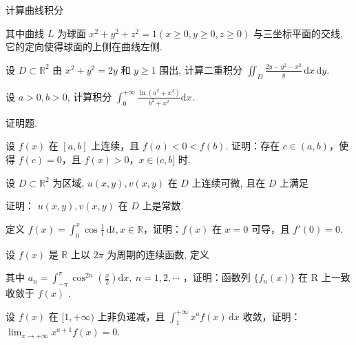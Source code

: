 计算曲线积分\par
\nopagebreak[4]
其中曲线 $L$ 为球面 $x^{2} + y^{2} + z^{2} = 1 (x \geq 0, y \geq 0, z \geq 0)$ 与三坐标平面的交线, 它的定向使得球面的上侧在曲线左侧.\par
设 $D \subset \mathbb{R}^2$ 由 $x^2 + y^2 = 2y$ 和 $y \geq 1$ 围出, 计算二重积分 $\iint_{D} \frac{2y - y^2 - x^2}{y} \, \mathrm{d}x \, \mathrm{d}y$.\par
设 $a > 0, b > 0$, 计算积分 $\int_0^{+\infty} \frac{\ln(a^2 + x^2)}{b^2 + x^2} \mathrm{d}x$.\par
\par{}
证明题.\par
设 $f(x)$ 在 $[a, b]$ 上连续，且 $f(a) < 0 < f(b)$. 证明：存在 $c \in (a, b)$，使得 $f(c) = 0$，且 $f(x) > 0$，$x \in (c, b]$ 时.\par
\par{}
设 $D \subset \mathbb{R}^2$ 为区域, $u(x, y), v(x, y)$ 在 $D$ 上连续可微, 且在 $D$ 上满足\par
\nopagebreak[4]
证明： $u(x,y),v(x,y)$ 在 $D$ 上是常数.\par
定义 $f(x) = \int_0^x \cos \frac{1}{t} \, \mathrm{d}t, x \in \mathbb{R}$，证明：$f(x)$ 在 $x = 0$ 可导，且 $f'(0) = 0$.\par
\par{}
设 $f(x)$ 是 $\mathbb{R}$ 上以 $2\pi$ 为周期的连续函数, 定义\par
\nopagebreak[4]
其中  $a_{n}=\int_{-\pi}^{\pi}\cos^{2n}\left(\frac{x}{2}\right)\mathrm{d}x,\ n=1,2,\cdots$  ，证明：函数列  $\{f_{n}(x)\}$  在 R 上一致收敛于  $f(x)$ .\par
设 $f(x)$ 在 $[1, +\infty)$ 上非负递减，且 $\int_{1}^{+\infty} x^{a} f(x) \, \mathrm{d}x$ 收敛，证明：$\lim_{x \to +\infty} x^{a+1} f(x) = 0$.\par

